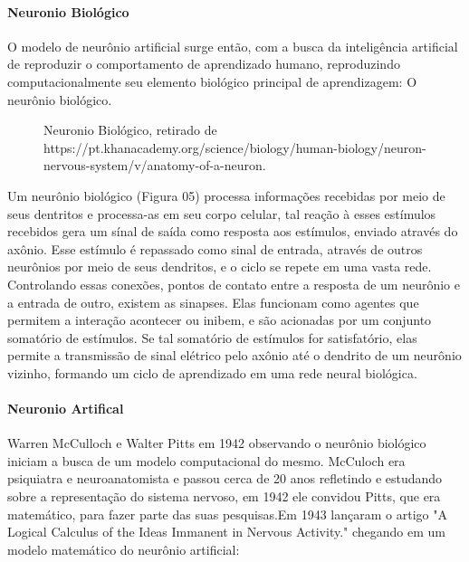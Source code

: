 \documentclass[	12pt, Times, openright, twoside, a4paper, english, brazil]{abntex2}
\begin{document}
          \paragraph*{Neuronio Biológico}
            O modelo de neurônio artificial surge então, com a busca da inteligência artificial de reproduzir o comportamento de aprendizado humano, reproduzindo computacionalmente seu elemento biológico principal de aprendizagem: O neurônio biológico. 
            \begin{figure}[!ht]
              \caption{Neuronio Biológico, retirado de https://pt.khanacademy.org/science/biology/human-biology/neuron-nervous-system/v/anatomy-of-a-neuron.\label{fig:NeuronioBiológico}}
            \end{figure}
            Um neurônio biológico (Figura 05) processa informações recebidas por meio de seus dentritos e processa-as em seu corpo celular, tal reação à esses estímulos recebidos gera um sínal de saída como resposta aos estímulos, enviado através do axônio. Esse estímulo é repassado como sinal de entrada, através de outros neurônios por meio de seus dendritos, e o ciclo se repete em uma vasta rede.
            Controlando essas conexões, pontos de contato entre a resposta de um neurônio e a entrada de outro, existem as sinapses. Elas funcionam como agentes que permitem a interação acontecer ou inibem, e são acionadas por um conjunto somatório de estímulos. Se tal somatório de estímulos for satisfatório, elas permite a transmissão de sinal elétrico pelo axônio até o dendrito de um neurônio vizinho, formando um ciclo de aprendizado em uma rede neural biológica.

          \paragraph*{Neuronio Artifical}
            Warren McCulloch e Walter Pitts em 1942 observando o neurônio biológico iniciam a busca de um modelo computacional do mesmo. McCuloch era psiquiatra e neuroanatomista e passou cerca de 20 anos refletindo e estudando sobre a representação do sistema nervoso, em 1942 ele convidou Pitts, que era matemático, para fazer parte das suas pesquisas.Em 1943 lançaram o artigo "A Logical Calculus of the Ideas Immanent in Nervous Activity." chegando em um modelo matemático do neurônio artificial: 
\end{document}
